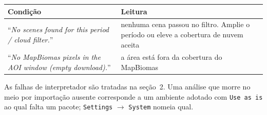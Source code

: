 \documentclass[12pt,a4paper]{article}
\newcommand{\msg}[1]{``\textit{#1}''}
\begin{document}
\begin{center}
\label{tab:execucao}
\small
\renewcommand{\arraystretch}{1.18}
\begin{tabular}{@{}L{7.6cm}L{8.0cm}@{}}
\toprule
\textbf{Condi\c{c}\~ao} & \textbf{Leitura} \\
\midrule
\msg{No scenes found for this period / cloud filter.} & nenhuma cena passou no filtro. Amplie o per\'iodo ou eleve a cobertura de nuvem aceita \\
\msg{No MapBiomas pixels in the AOI window (empty download).} & a \'area est\'a fora da cobertura do MapBiomas \\
\bottomrule
\end{tabular}
\end{center}

 As falhas de interpretador s\~ao tratadas na
se\c{c}\~ao~2. Uma an\'alise que morre no meio por importa\c{c}\~ao ausente
corresponde a um ambiente adotado com \texttt{Use as is} ao qual falta um
pacote; \texttt{Settings} $\rightarrow$ \texttt{System} nomeia qual.
\end{document}
